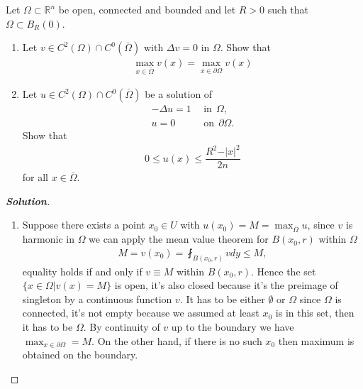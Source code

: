 \documentclass[11pt,reqno]{amsart}
\def\M{M}
\newcommand{\R}{\mathbb{R}}
\newcommand{\<}{\langle}
\renewcommand{\>}{\rangle}
\newcommand{\norm}[1]{\vert#1\vert}
\begin{document}
\begin{enumerate}[label={\arabic*.}]
\newpage
\begin{tcolorbox}
\item Let $\Omega \subset \R^n$ be open, connected and bounded and let $R>0$ such that $\Omega \subset B_R(0)$.
\begin{enumerate}[leftmargin=*]
\item Let $v \in C^2(\Omega) \cap C^0 (\bar{\Omega})$ with $\Delta v
 = 0$ in $\Omega$. Show that 
\begin{align*}
\max\limits_{x\in \bar{\Omega}} v(x) = \max\limits_{x\in \partial \Omega} v(x)
\end{align*} 
\item Let $u \in C^2(\Omega) \cap C^0(\bar{\Omega})$ be a solution of 
\begin{align*}
-\Delta u = 1 \ \ & \text{in}\ \ \Omega,\\
u=0 \ \ &\text{on}\ \ \partial \Omega. 
\end{align*}
 Show that 
 \begin{align*}
 0\leq u(x) \leq \dfrac{R^2 - \norm{x}^2}{2n}
 \end{align*}
for all $x\in \bar{\Omega}$. 
\end{enumerate}
\end{tcolorbox}
\bigskip


\begin{proof}[\bf{Solution}]
\leavevmode
\begin{enumerate}
\item Suppose there exists a point $x_0 \in U$ with $u(x_0) = \M =\max_{\bar{\Omega}} u$, since $v$ is harmonic in $\Omega$ we can apply the mean value theorem for $B(x_0, r)$ within $\Omega$
\begin{align*}
\M = v(x_0) = \fint_{B(x_0, r)} v dy \leq M,
\end{align*}
equality holds if and only if $v\equiv M$ within $B(x_0, r)$. Hence the set $\{x\in \Omega | v(x) = M\}$ is open, it's also closed because it's the preimage of singleton by a continuous function $v$. It has to be either $\emptyset$ or $\Omega$ since $\Omega$ is connected, it's not empty because we assumed at least $x_0$ is in this set, then it has to be $\Omega$. By continuity of $v$ up to the boundary we have $\max_{x\in \partial \Omega} = M$. On the other hand, if there is no such $x_0$ then maximum is obtained on the boundary.


\end{enumerate}
\end{proof}
\end{enumerate}
\end{document}
